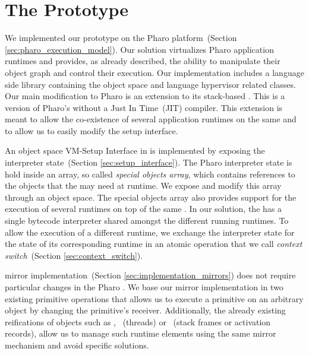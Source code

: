 
\chapter{The \Vtt Prototype}
\minitoc
{}
\introduction

We implemented our \Vtt prototype on the Pharo platform~(Section \ref{sec:pharo_execution_model}). Our solution virtualizes Pharo application runtimes and provides, as already described, the ability to manipulate their object graph and control their execution. Our implementation includes a language side library containing the object space and language hypervisor related classes. Our main modification to Pharo is an extension to its stack-based \VM. This \VM is a version of Pharo's \VM without a Just In Time~(JIT) compiler. This extension is meant to allow the co-existence of several application runtimes on the same \VM and to allow us to easily modify the \VM setup interface.

An object space VM-Setup Interface in \Vtt is implemented by exposing the \VM interpreter state~(Section \ref{sec:setup_interface}). The Pharo \VM interpreter state is hold inside an array, so called \emph{special objects array}, which contains references to the objects that the \VM may need at runtime. We expose and modify this array through an object space. The special objects array also provides support for the execution of several runtimes on top of the same \VM. In our solution, the \VM has a single bytecode interpreter shared amongst the different running runtimes. To allow the execution of a different runtime, we exchange the interpreter state for the state of its corresponding runtime in an atomic operation that we call \emph{context switch}~(Section \ref{sec:context_switch}).

\Vtt mirror implementation~(Section \ref{sec:implementation_mirrors}) does not require particular changes in the Pharo \VM. We base our mirror implementation in two existing \VM primitive operations that allows us to execute a primitive on an arbitrary object by changing the primitive's receiver. Additionally, the already existing reifications of objects such as , ~(threads) or ~(stack frames or activation records), allow us to manage such runtime elements using the same mirror mechanism and avoid specific solutions.


